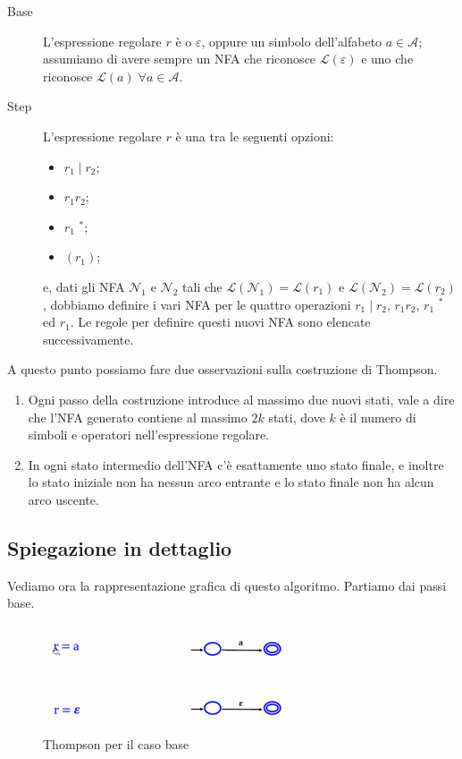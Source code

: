 \documentclass[class=book, crop=false, oneside, 12pt]{standalone}
\begin{document}
\begin{description}
    \item[Base] L'espressione regolare \(r\) è o \(\varepsilon\), oppure un simbolo dell’alfabeto \(a \in \mathcal{A}\); assumiamo di avere sempre un NFA che riconosce \(\mathcal{L}(\varepsilon)\) e uno che riconosce \(\mathcal{L}(a) \; \forall a \in \mathcal{A}\).
    \item[Step] L'espressione regolare \(r\) è una tra le seguenti opzioni: 
    \begin{itemize}[noitemsep]
        \item \(r_1 \mid  r_2 \);
        \item \( r_1 r_2 \); 
        \item \( r_1\) \(^\ast \);
        \item \((r_1)\);
    \end{itemize}
    e, dati gli NFA \(\mathcal{N}_1\) e \(\mathcal{N}_2\) tali che \(\mathcal{L}(\mathcal{N}_1)=\mathcal{L}(r_1)\) e \(\mathcal{L}(\mathcal{N}_2) = \mathcal{L}(r_2)\), dobbiamo definire i vari NFA per le quattro operazioni \(r_1 \mid r_2\), \(r_1 r_2\), \(r_1\) \(^\ast\) ed \(r_1\). Le regole per definire questi nuovi NFA sono elencate successivamente.
\end{description}

\noindent A questo punto possiamo fare due osservazioni sulla costruzione di Thompson.

\begin{enumerate}
    \item Ogni passo della costruzione introduce al massimo due nuovi stati, vale a dire che l’NFA generato contiene al massimo \(2k\) stati, dove \(k\) è il numero di simboli e operatori nell’espressione regolare.
    \item In ogni stato intermedio dell’NFA c’è esattamente uno stato finale, e inoltre lo stato iniziale non ha nessun arco entrante e lo stato finale non ha alcun arco uscente. 
\end{enumerate}

\subsection{Spiegazione in dettaglio}
Vediamo ora la rappresentazione grafica di questo algoritmo. Partiamo dai passi base.

\begin{figure}
    \centering
    \includegraphics[width=.5\textwidth,keepaspectratio]{Thompson_base}
    \caption{Thompson per il caso base}
    \label{Thompson_base}
\end{figure}
\end{document}
